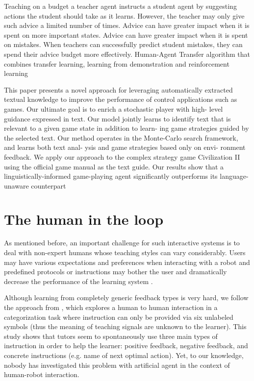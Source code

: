 \cite{torrey2013teaching} Teaching on a budget
a teacher agent instructs a student agent by suggesting actions the student should take as it learns. However, the teacher may only give such advice a limited number of times.  Advice can have greater impact when it is spent on more
important states. Advice can have greater impact when it is spent on mistakes. When teachers can successfully predict student mistakes, they
can spend their advice budget more effectively.
\cite{taylor2011integrating} Human-Agent Transfer algorithm that combines transfer learning, learning from demonstration and reinforcement learning

\cite{branavan2011learning} This paper presents a novel approach for leveraging automatically extracted textual knowledge to improve the performance of control applications such as games. Our ultimate goal is to enrich a stochastic player with high- level guidance expressed in text. Our model jointly learns to identify text that is relevant to a given game state in addition to learn- ing game strategies guided by the selected text. Our method operates in the Monte-Carlo search framework, and learns both text anal- ysis and game strategies based only on envi- ronment feedback. We apply our approach to the complex strategy game Civilization II using the official game manual as the text guide. Our results show that a linguistically-informed game-playing agent significantly outperforms its language-unaware counterpart

\section{The human in the loop}
\label{chapter:related:humanintheloop}

As mentioned before, an important challenge for such interactive systems is to deal with non-expert humans whose teaching styles can vary considerably. Users may have various expectations and preferences when interacting with a robot and predefined protocols or instructions may bother the user and dramatically decrease the performance of the learning system \cite{rouanet2013impact}. 

Although learning from completely generic feedback types is very hard, we follow the approach from \cite{griffiths2012bottom}, which explores a human to human interaction in a categorization task where instruction can only be provided via six unlabeled symbols (thus the meaning of teaching signals are unknown to the learner). This study shows that tutors seem to spontaneously use three main types of instruction in order to help the learner: positive feedback, negative feedback, and concrete instructions (e.g. name of next optimal action). Yet, to our knowledge, nobody has investigated this problem with artificial agent in the context of human-robot interaction.


